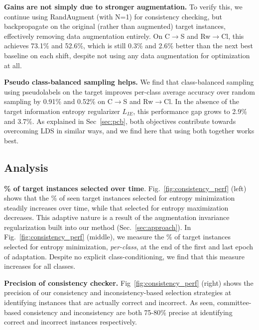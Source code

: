 \documentclass[10pt,twocolumn,letterpaper]{article}
\begin{document}
 \noindent \textbf{Gains are not simply due to stronger augmentation.} To verify this, we continue using RandAugment (with N=1) for consistency checking, but backpropagate on the original (rather than augmented) target instances, effectively removing data augmentation entirely. On C$\to$S and Rw$\to$Cl, this achieves 73.1\% and 52.6\%, which is still 0.3\% and 2.6\% better than the next best baseline on each shift, despite not using any data augmentation for optimization at all.

\noindent \textbf{Pseudo class-balanced sampling helps.} We find that class-balanced sampling using pseudolabels on the target improves per-class average accuracy over random sampling by 0.91\% and 0.52\% on C$\rightarrow$S and Rw$\rightarrow$Cl. In the absence of the target information entropy regularizer $L_{IE}$, this performance gap grows to 2.9\% and 3.7\%.
As explained in Sec~\ref{sec:pcb}, both objectives contribute towards overcoming LDS in similar ways, and we find here that using both together works best.

\vspace{-5pt}
\subsection{Analysis}
\label{ref:analysis}
\vspace{-2pt}



\par\noindent \textbf{\% of target instances selected over time}. Fig.~\ref{fig:consistency_perf} (left) shows that the \% of seen target instances selected for entropy minimization steadily increases over time, while that selected for entropy maximization decreases. This adaptive nature is a result of the augmentation invariance regularization built into our method (Sec.~\ref{sec:approach}). In Fig.~\ref{fig:consistency_perf} (middle), we measure the \% of target instances selected for entropy minimization, \emph{per-class}, at the end of the first and last epoch of adaptation. Despite no explicit class-conditioning, we find that this measure increases for all classes.



\par\noindent \textbf{Precision of consistency checker.} Fig~\ref{fig:consistency_perf} (right) shows the precision of our consistency and inconsistency-based selection strategies at identifying instances that are actually correct and incorrect. As seen, committee-based consistency and inconsistency are both 75-80\% precise at identifying correct and incorrect instances respectively.
\end{document}
